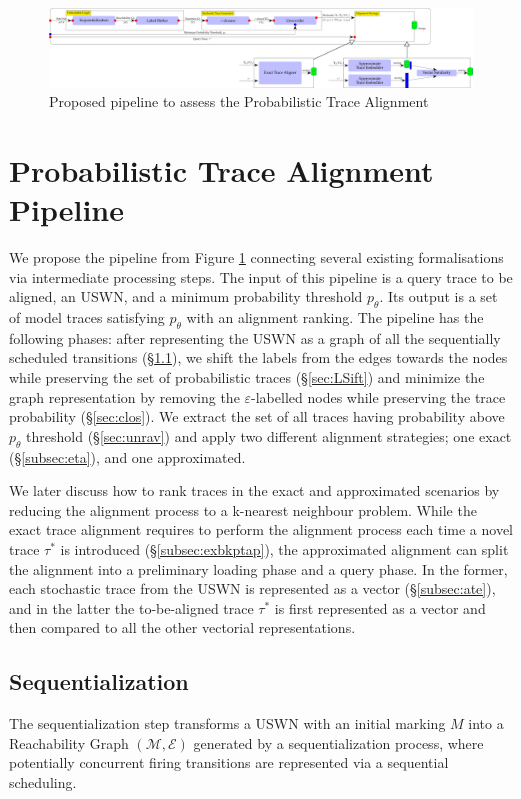 
\begin{figure}[!t]
	\hspace*{-4cm}\includegraphics[width=1.7\textwidth]{images/pipeline}
	\caption{Proposed pipeline to assess the Probabilistic Trace Alignment}\label{fig:pipe}
\end{figure}


\section{Probabilistic Trace Alignment Pipeline}
We propose the pipeline from Figure \ref{fig:pipe} connecting several existing formalisations via intermediate processing steps. 
The input of this pipeline is a query trace to be aligned, an USWN, and a minimum probability threshold $p_\theta$. Its output 
is a set of model traces satisfying $p_\theta$ with an alignment ranking.
%
The pipeline has the following phases: after representing the USWN as a graph of all the sequentially scheduled transitions 
(\S\ref{sec:seqZ}), we shift the labels from the edges towards the nodes while preserving the set of probabilistic traces 
(\S\ref{sec:LSift}) and minimize the graph representation by removing the $\varepsilon$-labelled nodes while preserving the 
trace probability (\S\ref{sec:clos}). We extract the set of all traces having probability above $p_\theta$ threshold (\S\ref{sec:unrav}) and  apply two different alignment strategies; one exact  (\S\ref{subsec:eta}), and one approximated. 


We later discuss how to rank traces in the exact and approximated scenarios by reducing the alignment process to a k-nearest 
neighbour problem. While the exact trace alignment requires to perform the alignment process each time a novel trace $\tau^*$ is 
introduced (\S\ref{subsec:exbkptap}), the approximated alignment can split the alignment into a preliminary loading phase and a 
query phase. In the former, each stochastic trace from the USWN is represented as a vector (\S\ref{subsec:ate}), and in the latter the to-be-aligned trace $\tau^*$ is first represented as a vector and then compared to all the other vectorial representations.  

\subsection{Sequentialization}\label{sec:seqZ}
The sequentialization step transforms a USWN with an initial marking $M$ into a Reachability Graph $(\mathcal{M},\mathcal{E})$ 
generated by a sequentialization process, where potentially concurrent firing transitions are represented via a sequential scheduling. 

